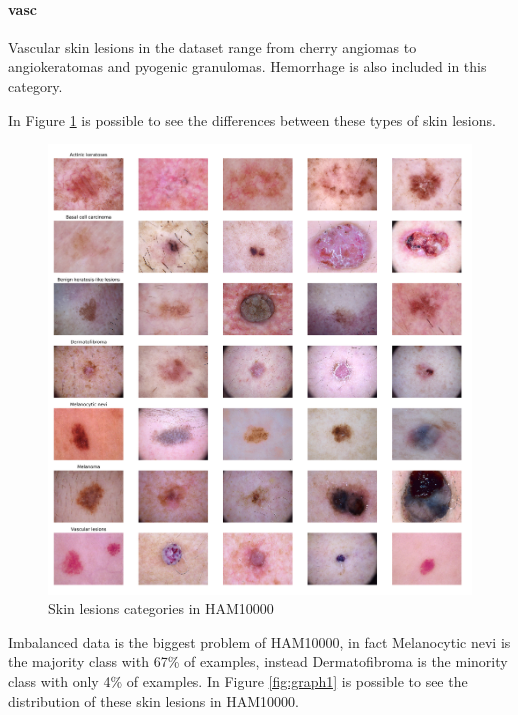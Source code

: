 	\paragraph{vasc}
	Vascular skin lesions in the dataset range from cherry angiomas to angiokeratomas and pyogenic granulomas. Hemorrhage is also included in this category.
	
	\bigskip
	
	In Figure \ref{fig:category_samples} is possible to see the differences between these types of skin lesions.
	
	\begin{figure}[H]
		\centering
		\includegraphics[width=15cm]{images/category_samples.png}
		\caption{Skin lesions categories in HAM10000}
		\label{fig:category_samples}
	\end{figure}
	
	Imbalanced data is the biggest problem of HAM10000, in fact Melanocytic nevi is the majority class with 67\% of examples, instead Dermatofibroma is the minority class with only 4\% of examples. In Figure \ref{fig:graph1} is possible to see the distribution of these skin lesions in HAM10000. 
	
	\smallskip
	
